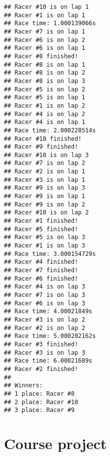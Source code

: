 \documentclass[]{book}
\begin{document}
\begin{verbatim}
## Racer #10 is on lap 1
## Racer #1 is on lap 1
## Race time: 1.000139066s
## Racer #7 is on lap 1
## Racer #6 is on lap 2
## Racer #6 is on lap 1
## Racer #8 finished!
## Racer #8 is on lap 1
## Racer #8 is on lap 2
## Racer #8 is on lap 3
## Racer #5 is on lap 2
## Racer #5 is on lap 1
## Racer #1 is on lap 2
## Racer #4 is on lap 2
## Racer #4 is on lap 1
## Race time: 2.000228514s
## Racer #10 finished!
## Racer #9 finished!
## Racer #10 is on lap 3
## Racer #7 is on lap 2
## Racer #2 is on lap 1
## Racer #3 is on lap 1
## Racer #9 is on lap 3
## Racer #9 is on lap 1
## Racer #9 is on lap 2
## Racer #10 is on lap 2
## Racer #1 finished!
## Racer #5 finished!
## Racer #5 is on lap 3
## Racer #1 is on lap 3
## Race time: 3.000154729s
## Racer #4 finished!
## Racer #7 finished!
## Racer #6 finished!
## Racer #4 is on lap 3
## Racer #7 is on lap 3
## Racer #6 is on lap 3
## Race time: 4.00021849s
## Racer #3 is on lap 2
## Racer #2 is on lap 2
## Race time: 5.000202162s
## Racer #3 finished!
## Racer #3 is on lap 3
## Race time: 6.00021689s
## Racer #2 finished!
## 
## Winners:
## 1 place: Racer #8
## 2 place: Racer #10
## 3 place: Racer #9
\end{verbatim}

\hypertarget{course-project}{%
\chapter*{Course project}\label{course-project}}
\end{document}
